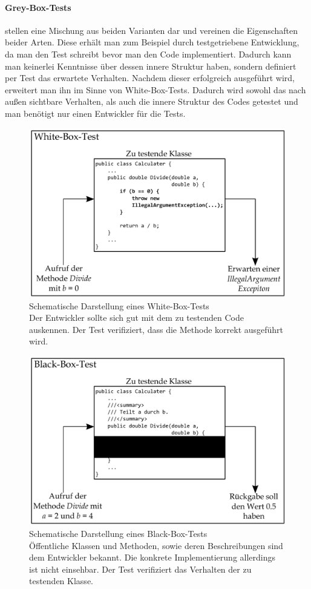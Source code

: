 \paragraph{Grey-Box-Tests} stellen eine Mischung aus beiden Varianten dar und vereinen die Eigenschaften beider Arten. Diese erhält man zum Beispiel durch testgetriebene Entwicklung, da man den Test schreibt bevor man den Code implementiert. Dadurch kann man keinerlei Kenntnisse über dessen innere Struktur haben, sondern definiert per Test das erwartete Verhalten. Nachdem dieser erfolgreich ausgeführt wird, erweitert man ihn im Sinne von White-Box-Tests. Dadurch wird sowohl das nach außen sichtbare Verhalten, als auch die innere Struktur des Codes getestet und man benötigt nur einen Entwickler für die Tests.

\clearpage
\begin{figure}[t]
\centering
\includegraphics[width=0.8\linewidth]{./images/Kapitel_Einleitung/White_Box_Test.pdf}
\caption[Schematische Darstellung eines White-Box-Tests]{Schematische Darstellung eines White-Box-Tests\\Der Entwickler sollte sich gut mit dem zu testenden Code auskennen. Der Test verifiziert, dass die Methode korrekt ausgeführt wird.}
\label{fig:White_Box_Test}
\end{figure}

\begin{figure}[b]
\centering
\includegraphics[width=0.8\linewidth]{./images/Kapitel_Einleitung/Black_Box_Test.pdf}
\caption[Schematische Darstellung eines Black-Box-Tests]{Schematische Darstellung eines Black-Box-Tests\\Öffentliche Klassen und Methoden, sowie deren Beschreibungen sind dem Entwickler bekannt. Die konkrete Implementierung allerdings ist nicht einsehbar. Der Test verifiziert das Verhalten der zu testenden Klasse.}
\label{fig:Black_Box_Test}
\end{figure}
\clearpage

